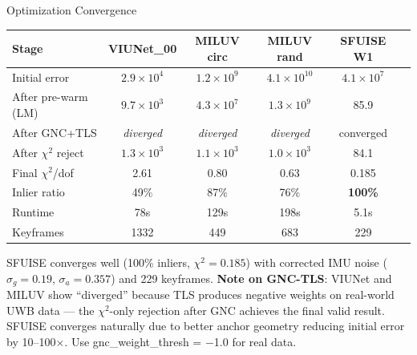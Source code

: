 \documentclass[10pt,aspectratio=169]{beamer}
\begin{document}
\begin{frame}{Optimization Convergence}
\centering
\begin{table}
\centering\footnotesize
\begin{tabular}{lccccc}
\toprule
\textbf{Stage} & \textbf{VIUNet\_00} & \textbf{MILUV circ} & \textbf{MILUV rand} & \textbf{SFUISE W1} \\
\midrule
Initial error      & $2.9\times 10^4$ & $1.2\times 10^9$ & $4.1\times 10^{10}$ & $4.1\times 10^7$ \\
After pre-warm (LM) & $9.7\times 10^3$ & $4.3\times 10^7$ & $1.3\times 10^9$ & 85.9 \\
After GNC+TLS       & \textit{diverged} & \textit{diverged} & \textit{diverged} & converged \\
After $\chi^2$ reject & $1.3\times 10^3$ & $1.1\times 10^3$ & $1.0\times 10^3$ & 84.1 \\
\midrule
Final $\chi^2$/dof   & 2.61 & 0.80 & 0.63 & 0.185 \\
Inlier ratio         & 49\% & 87\% & 76\% & \textbf{100\%} \\
Runtime              & 78s & 129s & 198s & 5.1s \\
Keyframes            & 1332 & 449 & 683 & 229 \\
\bottomrule
\end{tabular}
\end{table}

\vspace{0.2cm}
{\footnotesize SFUISE converges well (100\% inliers, $\chi^2{=}0.185$) with
corrected IMU noise ($\sigma_g{=}0.19$, $\sigma_a{=}0.357$) and 229 keyframes.
\textbf{Note on GNC-TLS}: VIUNet and MILUV show ``diverged'' because TLS produces
negative weights on real-world UWB data — the $\chi^2$-only rejection after GNC
achieves the final valid result. SFUISE converges naturally due to better anchor
geometry reducing initial error by 10--100$\times$. Use gnc\_weight\_thresh = $-$1.0
for real data.}
\end{frame}
\end{document}
